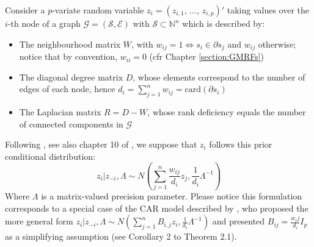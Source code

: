 \documentclass[openany]{book}
\begin{document}
Consider a $p$-variate random variable $z_i = (z_{i,1},   \, \ldots, \, z_{i,p})'$ taking values over the $i$-th node of a graph $\mathcal{G}=(\mathcal{S}, \mathcal{E})$ with $\mathcal{S} \subset \mathbb{N}^n$ which is described by:
\begin{itemize}
\item The neighbourhood matrix $W$, with $w_{ij} = 1 \Longleftrightarrow s_i \in \partial s_j$ and $w_{ij}$ otherwise; notice that by convention, $w_{ii}=0$ (cfr Chapter \ref{section:GMRFs})
\item The diagonal degree matrix $D$, whose elements correspond to the number of edges of each node, hence $d_i = \sum_{j=1}^{n} w_{ij} = \mathrm{card}(\partial s_i)$
\item The Laplacian matrix $R = D - W$, whose rank deficiency equals the number of connected components in $\mathcal{G}$
\end{itemize}

Following \cite{Mardia}, see also chapter 10 of \cite{Banerjee}, we suppose that $z_i$ follows this prior conditional distribution:
$$
z_i | z_{-i}, \Lambda \sim N \left(\sum_{j=1}^{n} \frac{w_{ij}}{d_i}z_{j}, \frac{1}{d_i} \Lambda^{-1}\right)
$$
Where $\Lambda$ is a matrix-valued precision parameter. Please notice this formulation corresponds to a special case of the CAR model described by \cite{Mardia}, who proposed the more general form $z_i | z_{-i}, \Lambda \sim N \left(\sum_{j=1}^{n} B_{i,j} z_{i}, \frac{1}{d_i} \Lambda^{-1}\right)$ and presented $B_{ij} = \frac{w_ij}{d_i} I_p$ as a simplifying assumption (see Corollary 2 to Theorem 2.1). 
\end{document}
